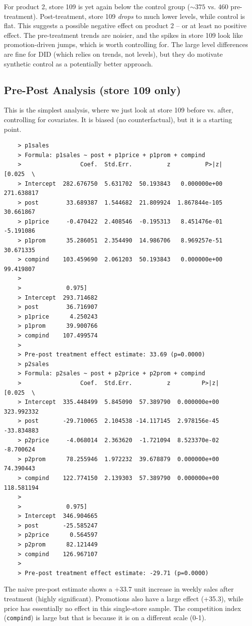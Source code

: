 \documentclass[10pt]{article}
\begin{document}
For product 2, store 109 is yet again below the control group ($\sim 375 $ vs. 460 pre-treatment). Post-treatment, store 109 \textit{drops} to much lower levels, while control is flat. This suggests a possible negative effect on product 2 -- or at least no positive effect. The pre-treatment trends are noisier, and the spikes in store 109 look like promotion-driven jumps, which is worth controlling for. The large level differences are fine for DID (which relies on trends, not levels), but they do motivate synthetic control as a potentially better approach. 
\newpage
\subsection{Pre-Post Analysis (store 109 only)}
This is the simplest analysis, where we just look at store 109 before vs. after, controlling for covariates. It is biased (no counterfactual), but it is a starting point. 

\begin{verbatim}
    > p1sales
    > Formula: p1sales ~ post + p1price + p1prom + compind
    >                 Coef.  Std.Err.          z          P>|z|      [0.025  \
    > Intercept  282.676750  5.631702  50.193843   0.000000e+00  271.638817   
    > post        33.689387  1.544682  21.809924  1.867844e-105   30.661867   
    > p1price     -0.470422  2.408546  -0.195313   8.451476e-01   -5.191086   
    > p1prom      35.286051  2.354490  14.986706   8.969257e-51   30.671335   
    > compind    103.459690  2.061203  50.193843   0.000000e+00   99.419807   
    > 
    >             0.975]  
    > Intercept  293.714682  
    > post        36.716907  
    > p1price      4.250243  
    > p1prom      39.900766  
    > compind    107.499574  
    > 
    > Pre-post treatment effect estimate: 33.69 (p=0.0000)
    > p2sales
    > Formula: p2sales ~ post + p2price + p2prom + compind
    >                 Coef.  Std.Err.          z         P>|z|      [0.025  \
    > Intercept  335.448499  5.845090  57.389790  0.000000e+00  323.992332   
    > post       -29.710065  2.104538 -14.117145  2.978156e-45  -33.834883   
    > p2price     -4.068014  2.363620  -1.721094  8.523370e-02   -8.700624   
    > p2prom      78.255946  1.972232  39.678879  0.000000e+00   74.390443   
    > compind    122.774150  2.139303  57.389790  0.000000e+00  118.581194   
    >   
    >             0.975]  
    > Intercept  346.904665  
    > post       -25.585247  
    > p2price      0.564597  
    > p2prom      82.121449  
    > compind    126.967107  
    > 
    > Pre-post treatment effect estimate: -29.71 (p=0.0000)
\end{verbatim}
The naive pre-post estimate shows a +33.7 unit increase in weekly sales after treatment (highly significant). Promotions also have a large effect (+35.3), while price has essentially no effect in this single-store sample. The competition index (\verb|compind|) is large but that is because it is on a different scale (0-1). 
\end{document}
